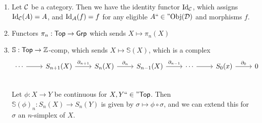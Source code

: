 \documentclass[x11names,reqno,14pt]{extarticle}
\newcommand{\fin}{``\in"}
\begin{document}
\exm

\begin{enumerate}

\item Let $\mathcal{C}$ be a category. Then we have the identity functor $\operatorname{\mathrm{Id}}_{\mathcal{C}}$, which assigns $\operatorname{\mathrm{Id}}_{\mathcal{C}}(A) = A$, and $\operatorname{\mathrm{Id}}_{\mathcal{A}}(f) = f$ for any eligible $A \fin\Obj(\mc{D})$ and morphisms $f$. 

\item Functors $\pi_n:{{\text{\sffamily {Top}}}}\to{{\text{\sffamily {Grp}}}}$ which sends $X\mapsto\pi_n(X)$

\item $\mathbb{S}:{{\text{\sffamily {Top}}}}\to\mathbb{Z}$-comp, which sends $X\mapsto \mathbb{S}(X)$, which is a complex
\[
\begin{tikzcd}
\cdots \ar[r]&   S_{n + 1}(X)  \ar[r, "\del_{n + 1}"] &  S_n(X) \ar[r, "\del_n"]& S_{n - 1}(X) \ar[r, "\del_{n - 1}"] &\cdots \ar[r] &\ar[r,"\del_0"] S_0(x) & 0\\ 
\end{tikzcd}
\]
Let $\phi:X\to Y$ be continuous for $X, Y \fin \Top$. Then $\mathbb{S}(\phi)_n:S_n(X)\to S_n(Y)$ is given by $\sigma\mapsto\phi\circ\sigma$, and we can extend this for $\sigma$ an $n$-simplex of $X$. 

\end{enumerate}
\end{document}
